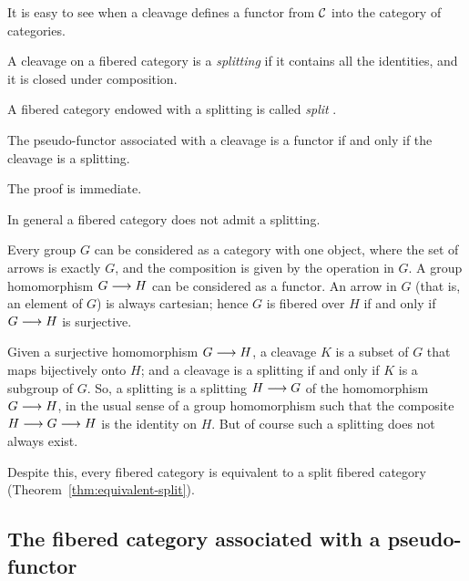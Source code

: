 \begin{3   FIBERED CATEGORIES}
\begin{3.1 Fibered categories}


It is easy to see when a cleavage defines a functor from $\mathcal{C}$ into the category of categories.

\begin{definition}
A cleavage on a fibered category is a \emph{splitting}%
 if it contains all the identities, and it is closed under composition.

A fibered category endowed with a splitting is called \emph{split}%
%
.
\end{definition}

\begin{proposition}
The pseudo-functor associated with a cleavage is a functor if and only if the cleavage is a splitting.
\end{proposition}

The proof is immediate.

In general a fibered category does not admit a splitting.

\begin{example}\label{ex:fibered-nosplitting}
Every group $G$ can be considered as a category with one object, where the set of arrows is exactly $G$, and the composition is given by the operation in $G$. A group homomorphism $G \arr H$ can be considered as a functor. An arrow in $G$ (that is, an element of $G$) is always cartesian; hence $G$ is fibered over $H$ if and only if $G \arr H$ is surjective.

Given a surjective homomorphism $G \arr H$, a cleavage $K$ is a subset of $G$ that maps bijectively onto $H$; and a cleavage is a splitting if and only if $K$ is a subgroup of $G$. So, a splitting is a splitting $H \arr  G$ of the homomorphism $G \arr H$, in the usual sense of a group homomorphism such that the composite $H \arr G \arr H$ is the identity on $H$. But of course such a splitting does not always exist.
\end{example}

Despite this, every fibered category is equivalent to a split fibered category (Theorem~\ref{thm:equivalent-split}).



\subsection{The fibered category associated with a pseudo-functor} \label{subsec:presheaf-cat}


\end{3.1 Fibered categories}
\end{3   FIBERED CATEGORIES}
